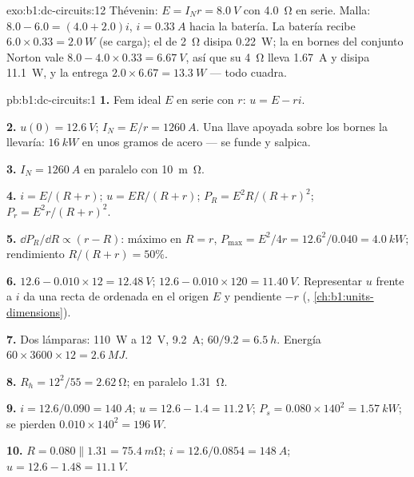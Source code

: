 \begin{solution}{exo:b1:dc-circuits:12}
Thévenin: $E = I_N r = \qty{8.0}{V}$ con \qty{4.0}{\ohm} en serie.
Malla: $8.0 - 6.0 = (4.0 + 2.0)i$, $i = \qty{0.33}{A}$ hacia la batería.
La batería recibe $6.0 \times 0.33 = \qty{2.0}{W}$ (se carga); el 
de \qty{2}{\ohm} disipa \qty{0.22}{W}; la  en bornes del conjunto
Norton vale $8.0 - 4.0 \times 0.33 = \qty{6.67}{V}$, así que su
\qty{4}{\ohm} lleva \qty{1.67}{A} y disipa \qty{11.1}{W}, y la  entrega $2.0 \times 6.67 = \qty{13.3}{W}$ --- todo cuadra.
\end{solution}

\begin{solution}{pb:b1:dc-circuits:1}
\textbf{1.} Fem ideal $E$ en serie con $r$: $u = E - ri$.

\textbf{2.} $u(0) = \qty{12.6}{V}$; $I_N = E/r = \qty{1260}{A}$. Una llave
apoyada sobre los bornes la llevaría: $\qty{16}{kW}$ en unos gramos de
acero --- se funde y salpica.

\textbf{3.}  $I_N = \qty{1260}{A}$ en paralelo con
\qty{10}{m\ohm}.

\textbf{4.} $i = E/(R + r)$; $u = ER/(R + r)$; $P_R = E^2R/(R + r)^2$;
$P_r = E^2r/(R + r)^2$.

\textbf{5.} $\dd P_R/\dd R \propto (r - R)$: máximo en $R = r$,
$P_{\max} = E^2/4r = 12.6^2/0.040 = \qty{4.0}{kW}$; rendimiento
$R/(R + r) = 50\%$.

\textbf{6.} $12.6 - 0.010 \times 12 = \qty{12.48}{V}$; $12.6 - 0.010 \times
120 = \qty{11.40}{V}$. Representar $u$ frente a $i$ da una recta de
ordenada en el origen $E$ y pendiente $-r$ (, \cref{ch:b1:units-dimensions}).

\textbf{7.} Dos lámparas: \qty{110}{W} a \qty{12}{V}, \qty{9.2}{A};
$60/9.2 = \qty{6.5}{h}$. Energía $60 \times 3600 \times 12 = \qty{2.6}{MJ}$.

\textbf{8.} $R_h = 12^2/55 = \qty{2.62}{\ohm}$; en paralelo \qty{1.31}{\ohm}.

\textbf{9.} $i = 12.6/0.090 = \qty{140}{A}$; $u = 12.6 - 1.4 = \qty{11.2}{V}$;
$P_s = 0.080 \times 140^2 = \qty{1.57}{kW}$; se pierden $0.010 \times 140^2 =
\qty{196}{W}$.

\textbf{10.} $R = 0.080 \parallel 1.31 = \qty{75.4}{m\ohm}$; $i = 12.6/0.0854
= \qty{148}{A}$; $u = 12.6 - 1.48 = \qty{11.1}{V}$.


\end{solution}
